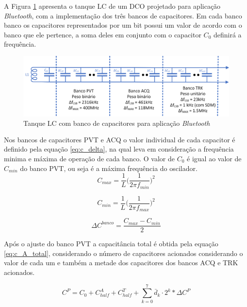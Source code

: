 A Figura \ref{fig:lc_bank_capacitor} apresenta o tanque LC de um DCO projetado para aplicação \textit{Bluetooth}, com a implementação dos três bancos de capacitores. Em cada banco banco os capacitores representados por um bit possui um valor de acordo com o banco que ele pertence, a soma deles em conjunto com o capacitor $C_0$ definirá a frequência. 

\begin{figure}[htb]
	\caption{Tanque LC com banco de capacitores para aplicação \textit{Bluetooth} }
	\begin{center}
		\includegraphics[scale=0.8]{img/lc_bank_capacitor.png}
	\end{center}
	\label{fig:lc_bank_capacitor}
\end{figure}


Nos bancos de capacitores PVT e ACQ o valor individual de cada capacitor é definido pela equação \ref{eq:c_delta}, na qual leva em consideração a frequência minima e máxima de operação de cada banco. O valor de $C_0$ é igual ao valor de $C_{min}$ do banco PVT, ou seja é a máxima frequência do oscilador.
\begin{equation}
	C_{max} = \frac{1}{L} \big( \frac{1}{2 \pi f_{min}} \big)^2
	\label{eq:cmax}
\end{equation}

\begin{equation}
	C_{min} = \frac{1}{L} \big( \frac{1}{2 \pi f_{max}} \big)^2
	\label{eq:cmin}
\end{equation}

\begin{equation}
	\Delta C^{banco} = \frac{	C_{max} - C_{min}}{2}
	\label{eq:c_delta}
\end{equation}

Após o ajuste do banco PVT a capacitância total é obtida pela equação \ref{eq:c_A_total}, considerando o número de capacitores acionados considerando o valor de cada um e também a metade dos capacitores dos bancos ACQ e TRK acionados.

\begin{equation}
	C^P = C_0 + C^A_{half} + C^T_{half} + \sum_{k=0}^{7} \bar{d}_k \cdot 2^k * 	\Delta C^P
	\label{eq:c_P_total}
\end{equation}

